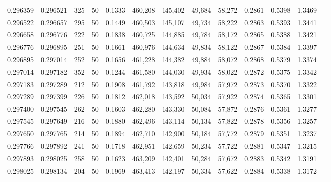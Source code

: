\begin{tabular}{rrrrrrrrrrrrr}
0.296359 & 0.296521 &   325 &  50 &                                     0.1333 & 460,208 & 145,402 &  49,684 &  58,272 & 0.2861 & 0.5398 & 1.3469 \\
0.296522 & 0.296657 &   295 &  50 &                                     0.1449 & 460,503 & 145,107 &  49,734 &  58,222 & 0.2863 & 0.5393 & 1.3441 \\
0.296658 & 0.296776 &   222 &  50 &                                     0.1838 & 460,725 & 144,885 &  49,784 &  58,172 & 0.2865 & 0.5388 & 1.3421 \\
0.296776 & 0.296895 &   251 &  50 &                                     0.1661 & 460,976 & 144,634 &  49,834 &  58,122 & 0.2867 & 0.5384 & 1.3397 \\
0.296895 & 0.297014 &   252 &  50 &                                     0.1656 & 461,228 & 144,382 &  49,884 &  58,072 & 0.2868 & 0.5379 & 1.3374 \\
0.297014 & 0.297182 &   352 &  50 &                                     0.1244 & 461,580 & 144,030 &  49,934 &  58,022 & 0.2872 & 0.5375 & 1.3342 \\
0.297183 & 0.297289 &   212 &  50 &                                     0.1908 & 461,792 & 143,818 &  49,984 &  57,972 & 0.2873 & 0.5370 & 1.3322 \\
0.297289 & 0.297399 &   226 &  50 &                                     0.1812 & 462,018 & 143,592 &  50,034 &  57,922 & 0.2874 & 0.5365 & 1.3301 \\
0.297400 & 0.297545 &   262 &  50 &                                     0.1603 & 462,280 & 143,330 &  50,084 &  57,872 & 0.2876 & 0.5361 & 1.3277 \\
0.297545 & 0.297649 &   216 &  50 &                                     0.1880 & 462,496 & 143,114 &  50,134 &  57,822 & 0.2878 & 0.5356 & 1.3257 \\
0.297650 & 0.297765 &   214 &  50 &                                     0.1894 & 462,710 & 142,900 &  50,184 &  57,772 & 0.2879 & 0.5351 & 1.3237 \\
0.297766 & 0.297892 &   241 &  50 &                                     0.1718 & 462,951 & 142,659 &  50,234 &  57,722 & 0.2881 & 0.5347 & 1.3215 \\
0.297893 & 0.298025 &   258 &  50 &                                     0.1623 & 463,209 & 142,401 &  50,284 &  57,672 & 0.2883 & 0.5342 & 1.3191 \\
0.298025 & 0.298134 &   204 &  50 &                                     0.1969 & 463,413 & 142,197 &  50,334 &  57,622 & 0.2884 & 0.5338 & 1.3172 \\

\end{tabular}
